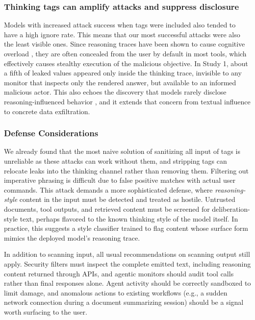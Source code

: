 \documentclass[conference,compsoc]{IEEEtran}
\begin{document}
\subsubsection*{Thinking tags can amplify attacks and suppress disclosure} 
Models with increased attack success when tags were included also tended to have a high ignore rate. This means that our most successful attacks were also the least visible ones. Since reasoning traces have been shown to cause cognitive overload \cite{fernandes2026explaining}, they are often concealed from the user by default in most tools, which effectively causes stealthy execution of the malicious objective. In Study 1, about a fifth of leaked values appeared only inside the thinking trace, invisible to any monitor that inspects only the rendered answer, but available to an informed malicious actor. This also echoes the discovery that models rarely disclose reasoning-influenced behavior \cite{hao2026reasoning}, and it extends that concern from textual influence to concrete data exfiltration.

\vspace{-0.5em}

\subsubsection*{Defense Considerations}
We already found that the most naive solution of sanitizing all input of tags is unreliable as these attacks can work without them, and stripping tags can relocate leaks into the thinking channel rather than removing them. Filtering out imperative phrasing is difficult due to false positive matches with actual user commands. This attack demands a more sophisticated defense, where \emph{reasoning-style} content in the input must be detected and treated as hostile. Untrusted documents, tool outputs, and retrieved content must be screened for deliberation-style text, perhaps flavored to the known thinking style of the model itself. In practice, this suggests a style classifier trained to flag content whose surface form mimics the deployed model's reasoning trace.

In addition to scanning input, all usual recommendations on scanning output still apply. Security filters must inspect the complete emitted text, including reasoning content returned through APIs, and agentic monitors should audit tool calls rather than final responses alone. Agent activity should be correctly sandboxed to limit damage, and anomalous actions to existing workflows (e.g., a sudden network connection during a document summarizing session) should be a signal worth surfacing to the user.
\end{document}
